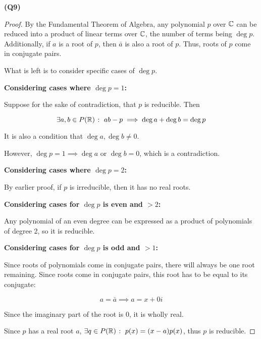 \documentclass[12pt, a4paper]{article}
\begin{document}
\textbf{(Q9)}

\begin{proof}
    By the Fundamental Theorem of Algebra, any polynomial $p$ over $\mathbb{C}$ can
    be reduced into a product of linear terms over $\mathbb{C}$, the number of terms
    being $\deg p$. Additionally, if $a$ is a root of $p$, then $\bar{a}$
    is also a root of $p$. Thus, roots of $p$ come in conjugate pairs.

    What is left is to consider specific cases of $\deg p$.

    \vspace{5mm}
    \textbf{Considering cases where $\deg p = 1$:}

    Suppose for the sake of contradiction, that $p$ is reducible. Then

    \[
        \exists a, b \in P(\mathbb{R}) \; \colon \; ab - p \implies \deg a + \deg b = \deg p
    \]

    It is also a condition that $\deg a, \deg b \neq 0$.

    However, $\deg p = 1 \implies \deg a$ or $\deg b = 0$, which is a contradiction.

    \vspace{5mm}
    \textbf{Considering cases where $\deg p = 2$:}

    By earlier proof, if $p$ is irreducible, then it has no real roots.

    \vspace{5mm}
    \textbf{Considering cases for $\deg p$ is even and $> 2$:}

    Any polynomial of an even degree can be expressed as a product of
    polynomials of degree 2, so it is reducible.

    \vspace{5mm}
    \textbf{Considering cases for $\deg p$ is odd and $> 1$:}

    Since roots of polynomials come in conjugate pairs, there will always
    be one root remaining. Since roots come in conjugate pairs, this root has to
    be equal to its conjugate:

    \[
        a = \bar{a} \implies a = x + 0i
    \]

    Since the imaginary part of the root is $0$, it is wholly real.

    Since $p$ has a real root $a$, $\exists q \in P(\mathbb{R}) \; \colon \; p(x) = (x - a)p(x)$,
    thus $p$ is reducible.

\end{proof}
\end{document}
